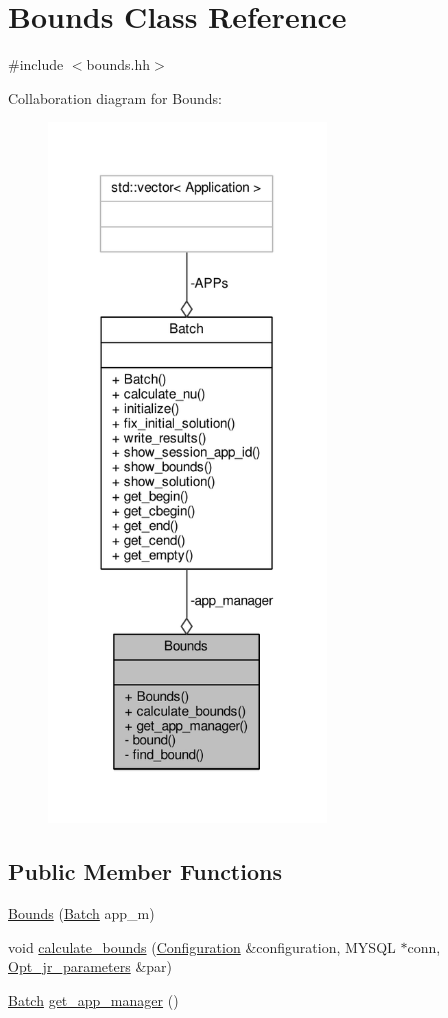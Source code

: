 \hypertarget{classBounds}{\section{Bounds Class Reference}
\label{classBounds}
}


{\ttfamily \#include $<$bounds.\-hh$>$}



Collaboration diagram for Bounds\-:
\nopagebreak
\begin{figure}[H]
\begin{center}
\leavevmode
\includegraphics[width=209pt]{classBounds__coll__graph}
\end{center}
\end{figure}
\subsection*{Public Member Functions}
\begin{DoxyCompactItemize}
\item 
\hyperlink{classBounds_a57a9894ee450eb885a83e884b5fb79e7}{Bounds} (\hyperlink{classBatch}{Batch} app\-\_\-m)
\item 
void \hyperlink{classBounds_a525c2a8bf52889857306bf77d698ecd1}{calculate\-\_\-bounds} (\hyperlink{classConfiguration}{Configuration} \&configuration, M\-Y\-S\-Q\-L $\ast$conn, \hyperlink{classOpt__jr__parameters}{Opt\-\_\-jr\-\_\-parameters} \&par)
\item 
\hyperlink{classBatch}{Batch} \hyperlink{classBounds_aefebbfe17ca3a7d6a0f6cbf4a0bf2782}{get\-\_\-app\-\_\-manager} ()
\end{DoxyCompactItemize}
